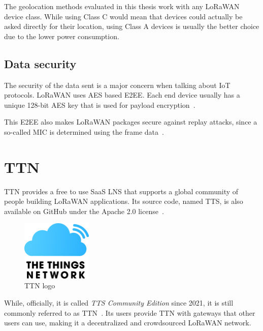 The geolocation methods evaluated in this thesis work with any \ac{LoRaWAN} device class.
While using Class C would mean that devices could actually be asked directly for their location, using Class A devices is usually the better choice due to the lower power consumption.

\subsection{Data security}

The security of the data sent is a major concern when talking about \ac{IoT} protocols.
\ac{LoRaWAN} uses \ac{AES} based \acf{E2EE}.
Each end device usually has a unique 128-bit \ac{AES} key that is used for payload encryption~\cite{lora_alliance_inc_lorawan_2017-1}.

This \ac{E2EE} also makes \ac{LoRaWAN} packages secure against replay attacks, since a so-called \ac{MIC} is determined using the frame data~\cite{lora_alliance_inc_lorawan_2017-1}.

\section{\acf{TTN}}

\ac{TTN} provides a free to use \ac{SaaS} \ac{LNS} that supports a global community of people building \ac{LoRaWAN} applications.
Its source code, named \ac{TTS}, is also available on GitHub under the Apache 2.0 license~\cite{the_things_network_thethingsnetworklorawan-stack_2023}.

\begin{figure}[htbp]
    \centering
    \includegraphics[width=0.3\textwidth]{pictures/logos/TTN-logo.eps}
    \caption{\acf{TTN} logo~\protect\cite{the_things_industries_bv_quick_nodate}}
\end{figure}


While, officially, it is called \emph{\acl{TTS} Community Edition} since 2021, it is still commonly referred to as \acf{TTN}~\cite{the_things_industries_bv_what_2022}.
Its users provide \ac{TTN} with gateways that other users can use, making it a decentralized and crowdsourced \ac{LoRaWAN} network.

